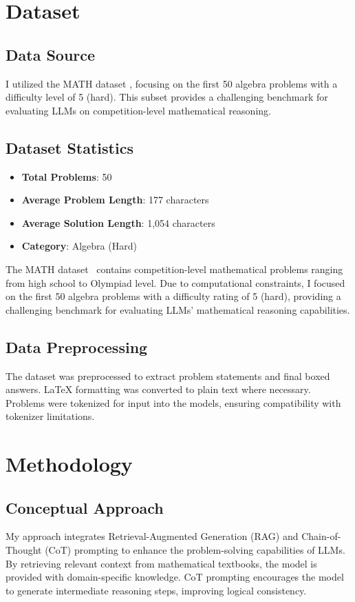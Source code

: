 \documentclass[11pt,a4paper]{article}
\begin{document}
\section{Dataset}
\subsection{Data Source}
I utilized the MATH dataset \cite{hendrycks2021measuringmathematicalproblemsolving}, focusing on the first 50 algebra problems with a difficulty level of 5 (hard). This subset provides a challenging benchmark for evaluating LLMs on competition-level mathematical reasoning.

\subsection{Dataset Statistics}
\begin{itemize}[noitemsep,nolistsep]
    \item \textbf{Total Problems}: 50
    \item \textbf{Average Problem Length}: 177 characters
    \item \textbf{Average Solution Length}: 1,054 characters
    \item \textbf{Category}: Algebra (Hard)
\end{itemize}

The MATH dataset~\cite{hendrycks2021measuringmathematicalproblemsolving} contains competition-level mathematical problems ranging from high school to Olympiad level. Due to computational constraints, I focused on the first 50 algebra problems with a difficulty rating of 5 (hard), providing a challenging benchmark for evaluating LLMs' mathematical reasoning capabilities.

\subsection{Data Preprocessing}
The dataset was preprocessed to extract problem statements and final boxed answers. LaTeX formatting was converted to plain text where necessary. Problems were tokenized for input into the models, ensuring compatibility with tokenizer limitations.

\section{Methodology}
\subsection{Conceptual Approach}
My approach integrates Retrieval-Augmented Generation (RAG) and Chain-of-Thought (CoT) prompting to enhance the problem-solving capabilities of LLMs. By retrieving relevant context from mathematical textbooks, the model is provided with domain-specific knowledge. CoT prompting encourages the model to generate intermediate reasoning steps, improving logical consistency.
\end{document}
